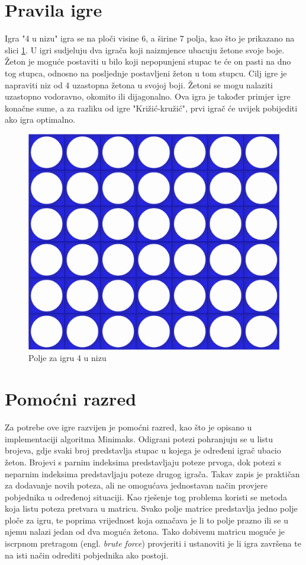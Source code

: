 \documentclass[times, utf8, seminar, numeric, tikz]{fer}
\begin{document}
\section{Pravila igre}
Igra "4 u nizu" igra se na ploči visine 6, a širine 7 polja, kao što je prikazano na slici \ref{fig:4inRow_board}. U igri sudjeluju dva igrača koji naizmjence ubacuju žetone svoje boje. Žeton je moguće postaviti u bilo koji nepopunjeni stupac te će on pasti na dno tog stupca, odnosno na posljednje postavljeni žeton u tom stupcu. Cilj igre je napraviti niz od 4 uzastopna žetona u svojoj boji. Žetoni se mogu nalaziti uzastopno vodoravno, okomito ili dijagonalno. Ova igra je također primjer igre konačne sume, a za razliku od igre "Križić-kružić", prvi igrač će uvijek pobijediti ako igra optimalno.\\

\begin{figure}[h]
	\centering
	\includegraphics[width=0.75\linewidth]{Images/4inRow_board}
	\caption{Polje za igru 4 u nizu}
	\label{fig:4inRow_board}
\end{figure}

\section{Pomoćni razred}
Za potrebe ove igre razvijen je pomoćni razred, kao što je opisano u implementaciji algoritma Minimaks. Odigrani potezi pohranjuju se u listu brojeva, gdje svaki broj predstavlja stupac u kojega je određeni igrač ubacio žeton. Brojevi s parnim indeksima predstavljaju poteze prvoga, dok potezi s neparnim indeksima predstavljaju poteze drugog igrača. Takav zapis je praktičan za dodavanje novih poteza, ali ne omogućava jednostavan način provjere pobjednika u određenoj situaciji. Kao rješenje tog problema koristi se metoda koja listu poteza pretvara u matricu. Svako polje matrice predstavlja jedno polje ploče za igru, te poprima vrijednost koja označava je li to polje prazno ili se u njemu nalazi jedan od dva moguća žetona. Tako dobivenu matricu moguće je iscrpnom pretragom (engl. \textit{brute force}) provjeriti i ustanoviti je li igra završena te na isti način odrediti pobjednika ako postoji.
\end{document}
